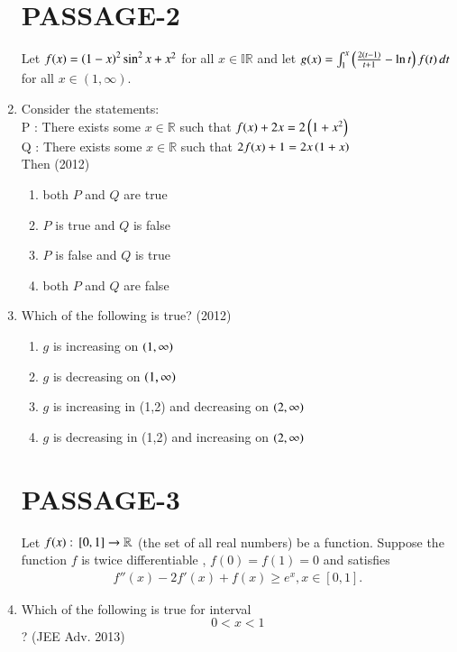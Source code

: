 \documentclass[journal,,12pt,twocolumn]{IEEEtran}
\theoremstyle{remark}
\begin{document}
\begin{enumerate}
\section*{PASSAGE-2}
Let $f(x)=\left(1-x\right)^2 \sin^2 x + x^2$ for all $x \in \mathbb{IR}$ and let $g(x)=
\int_{1}^{x} \left(\frac{2(t-1)}{t+1} - \ln t\right)  f(t) \, dt $ for all $x \in (1 ,\infty)$.
\item Consider the statements:\\
P : There exists some $x \in \mathbb{R}$ such that $f(x) + 2x = 2\left(1+x^2\right)$\\
Q : There exists some $x \in\mathbb{R}$ such that $2f(x) + 1 = 2x\left(1+x\right)$\\
    Then
    \hfill{(2012)}
\begin{enumerate}
\item both $P$ and $Q$ are true
\item $P$ is true and $Q$ is false
\item $P$ is false and $Q$ is true
\item both $P$ and $Q$ are false
\end{enumerate}



\item Which of the following is true?
\hfill{(2012)}
\begin{enumerate}

\item $g$ is increasing on $\left(1,\infty\right)$
\item $g$ is decreasing on $\left(1,\infty\right)$
\item $g$ is increasing in (1,2) and decreasing on $\left(2,\infty\right)$
\item $g$ is decreasing in (1,2) and increasing on $\left(2,\infty\right)$

\end{enumerate}


\section*{PASSAGE-3}
Let $f(x) : {}\left[0,1\right] \to\mathbb{R}$
(the set of all real numbers) be a function. Suppose the function $f$ is twice differentiable , $f(0)=f(1)=0$ and satisfies \begin{align} f''(x)-2f'(x)+f(x) \geq e^x , x \in [0,1].\end{align} 

\item Which of the following is true for interval     $$0<x<1$$?
\hfill{(JEE Adv. 2013)}


\end{enumerate}
\end{document}
